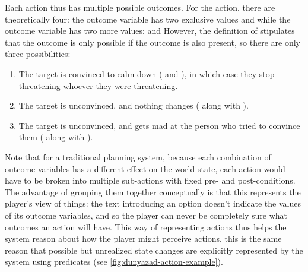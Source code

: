 Each action thus has multiple possible outcomes.
%
For the  action, there are theoretically four: the  outcome variable has two exclusive values  and  while the  outcome variable has two more values:  and 
%
However, the definition of  stipulates that the outcome  is only possible if the outcome  is also present, so there are only three possibilities:

\begin{enumerate}
  \item The target is convinced to calm down ( and ), in which case they stop threatening whoever they were threatening.
  \item The target is unconvinced, and nothing changes ( along with ).
  \item The target is unconvinced, and gets mad at the person who tried to convince them ( along with ).
\end{enumerate}

Note that for a traditional planning system, because each combination of outcome variables has a different effect on the world state, each action would have to be broken into multiple sub-actions with fixed pre- and post-conditions.
%
The advantage of grouping them together conceptually is that this represents the player's view of things: the text introducing an option doesn't indicate the values of its outcome variables, and so the player can never be completely sure what outcomes an action will have.
%
This way of representing actions thus helps the system reason about how the player might perceive actions, this is the same reason that possible but unrealized state changes are explicitly represented by the system using  predicates (see \cref{fig:dunyazad-action-example}).


